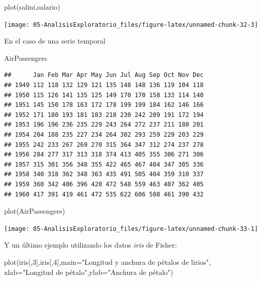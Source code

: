 \documentclass[
]{book}
\newenvironment{Shaded}{\begin{snugshade}}{\end{snugshade}}
\newcommand{\AttributeTok}[1]{\textcolor[rgb]{0.77,0.63,0.00}{#1}}
\newcommand{\DecValTok}[1]{\textcolor[rgb]{0.00,0.00,0.81}{#1}}
\newcommand{\FunctionTok}[1]{\textcolor[rgb]{0.00,0.00,0.00}{#1}}
\newcommand{\NormalTok}[1]{#1}
\newcommand{\StringTok}[1]{\textcolor[rgb]{0.31,0.60,0.02}{#1}}
\theoremstyle{break}
\theoremstyle{nonumberplain}
\begin{document}
\begin{Shaded}
\begin{Highlighting}[]
\FunctionTok{plot}\NormalTok{(salini,salario)}
\end{Highlighting}
\end{Shaded}

\begin{center}\texttt{[image: 05-AnalisisExploratorio\_files/figure-latex/unnamed-chunk-32-3]} \end{center}

En el caso de una serie temporal

\begin{Shaded}
\begin{Highlighting}[]
\NormalTok{AirPassengers}
\end{Highlighting}
\end{Shaded}

\begin{verbatim}
##      Jan Feb Mar Apr May Jun Jul Aug Sep Oct Nov Dec
## 1949 112 118 132 129 121 135 148 148 136 119 104 118
## 1950 115 126 141 135 125 149 170 170 158 133 114 140
## 1951 145 150 178 163 172 178 199 199 184 162 146 166
## 1952 171 180 193 181 183 218 230 242 209 191 172 194
## 1953 196 196 236 235 229 243 264 272 237 211 180 201
## 1954 204 188 235 227 234 264 302 293 259 229 203 229
## 1955 242 233 267 269 270 315 364 347 312 274 237 278
## 1956 284 277 317 313 318 374 413 405 355 306 271 306
## 1957 315 301 356 348 355 422 465 467 404 347 305 336
## 1958 340 318 362 348 363 435 491 505 404 359 310 337
## 1959 360 342 406 396 420 472 548 559 463 407 362 405
## 1960 417 391 419 461 472 535 622 606 508 461 390 432
\end{verbatim}

\begin{Shaded}
\begin{Highlighting}[]
\FunctionTok{plot}\NormalTok{(AirPassengers)}
\end{Highlighting}
\end{Shaded}

\begin{center}\texttt{[image: 05-AnalisisExploratorio\_files/figure-latex/unnamed-chunk-33-1]} \end{center}

Y un último ejemplo utilizando los datos \emph{iris} de Fisher:

\begin{Shaded}
\begin{Highlighting}[]
\FunctionTok{plot}\NormalTok{(iris[,}\DecValTok{3}\NormalTok{],iris[,}\DecValTok{4}\NormalTok{],}\AttributeTok{main=}\StringTok{"Longitud y anchura de pétalos de lirios"}\NormalTok{,}
     \AttributeTok{xlab=}\StringTok{"Longitud de pétalo"}\NormalTok{,}\AttributeTok{ylab=}\StringTok{"Anchura de pétalo"}\NormalTok{)}
\end{Highlighting}
\end{Shaded}
\end{document}
